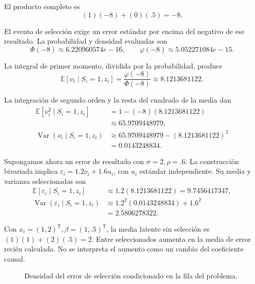 \documentclass[11pt,a4paper]{article}
\newcommand{\E}{\mathbb E}
\newcommand{\T}{^{\mathsf T}}
\DeclareMathOperator{\Var}{Var}
\begin{document}
El producto completo es
\[
(1)(-8)+(0)(.5)=-8.
\]

El evento de selección exige un error estándar
por encima del negativo de ese resultado.
La probabilidad y densidad evaluadas son
\[
\Phi(-8)\approx6.220960574e-16,\qquad\varphi(-8)\approx5.052271084e-15.
\]

La integral de primer momento, dividida
por la probabilidad, produce
\[
\E[\nu_i\mid S_i=1,z_i]
=\frac{\varphi(-8)}{\Phi(-8)}
\approx8.1213681122.
\]

La integración de segundo orden y
la resta del cuadrado de la media dan
\[
\begin{aligned}
\E[\nu_i^2\mid S_i=1,z_i]&=1-(-8)(8.1213681122)\\
&\approx65.9709448979,\\
\Var(\nu_i\mid S_i=1,z_i)&\approx65.9709448979-(8.1213681122)^2\\
&=0.0143248834.\end{aligned}
\]

Supongamos ahora un error de resultado con
\(\sigma=2,\rho=.6\).
La construcción bivariada implica
\(\varepsilon_i=1.2\nu_i+1.6u_i\),
con \(u_i\) estándar independiente.
Su media y varianza seleccionadas son
\[
\begin{aligned}
\E[\varepsilon_i\mid S_i=1,z_i]&\approx1.2(8.1213681122)
=9.7456417347,\\
\Var(\varepsilon_i\mid S_i=1,z_i)&\approx1.2^2(0.0143248834)+1.6^2\\
&=2.5806278322.\end{aligned}
\]

Con \(x_i=(1,2)\T,\beta=(1,.5)\T\),
la media latente sin selección es
\((1)(1)+(2)(.5)=2\).
Entre seleccionados aumenta en
la media de error recién calculada.
No se interpreta el aumento como
un cambio del coeficiente causal.


\begin{figure}[H]\centering
{}
\caption{Densidad del error de selección condicionado en la fila del problema.}
\end{figure}
\end{document}
